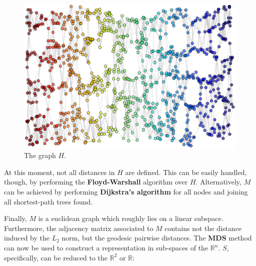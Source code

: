 \documentclass[12pt]{report}
\begin{document}
\begin{figure}[H]
	\centering
	\captionsetup{justification=centering}
	\includegraphics[width=.5\linewidth]{studying_isomap/neighbors}
	\caption{The graph $H$.}
	\label{fig:mani_s_graph_h}
\end{figure}

At this moment, not all distances in $H$ are defined. This can be easily handled, though, by performing the \textbf{Floyd-Warshall} algorithm over $H$. Alternatively, $M$ can be achieved by performing \textbf{Dijkstra's algorithm} for all nodes and joining all shortest-path trees found.

Finally, $M$ is a euclidean graph which roughly lies on a linear subspace. Furthermore, the adjacency matrix associated to $M$ contains not the distance induced by the $L_2$ norm, but the geodesic pairwise distances. \cite{gho2006} The \textbf{MDS} method can now be used to construct a representation in sub-spaces of the $\mathbb{R}^n$. $S$, specifically, can be reduced to the $\mathbb{R}^2$ or $\mathbb{R}$:
\end{document}
